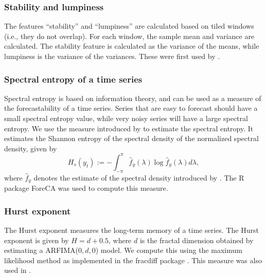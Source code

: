 \documentclass[11pt,a4paper,]{article}
\theoremstyle{definition}
\theoremstyle{definition}
\theoremstyle{definition}
\theoremstyle{remark}
\begin{document}
\hypertarget{stability-and-lumpiness}{%
\subsubsection*{Stability and lumpiness}\label{stability-and-lumpiness}}

The features ``stability'' and ``lumpiness'' are calculated based on
tiled windows (i.e., they do not overlap). For each window, the sample
mean and variance are calculated. The stability feature is calculated as
the variance of the means, while lumpiness is the variance of the
variances. These were first used by \textcite{hyndman2015large}.

\hypertarget{spectral-entropy-of-a-time-series}{%
\subsubsection*{Spectral entropy of a time
series}\label{spectral-entropy-of-a-time-series}}

Spectral entropy is based on information theory, and can be used as a
measure of the forecastability of a time series. Series that are easy to
forecast should have a small spectral entropy value, while very noisy
series will have a large spectral entropy. We use the measure introduced
by \textcite{goerg2013forecastable} to estimate the spectral entropy. It
estimates the Shannon entropy of the spectral density of the normalized
spectral density, given by \[
  H_{s}(y_t):=-\int_{-\pi}^{\pi}\hat f_y(\lambda)\log \hat f_y({\lambda})d\lambda,
\] where \(\hat{f}_y\) denotes the estimate of the spectral density
introduced by \textcite{nuttall1982spectral}. The R package ForeCA
\autocite{Foreca} was used to compute this measure.

\hypertarget{hurst-exponent}{%
\subsubsection*{Hurst exponent}\label{hurst-exponent}}

The Hurst exponent measures the long-term memory of a time series. The
Hurst exponent is given by \(H=d+0.5\), where \(d\) is the fractal
dimension obtained by estimating a ARFIMA(\(0, d, 0\)) model. We compute
this using the maximum likelihood method \autocite{haslett1989space} as
implemented in the fracdiff package \autocite{fracdiff}. This measure
was also used in \textcite{wang2009rule}.
\end{document}
